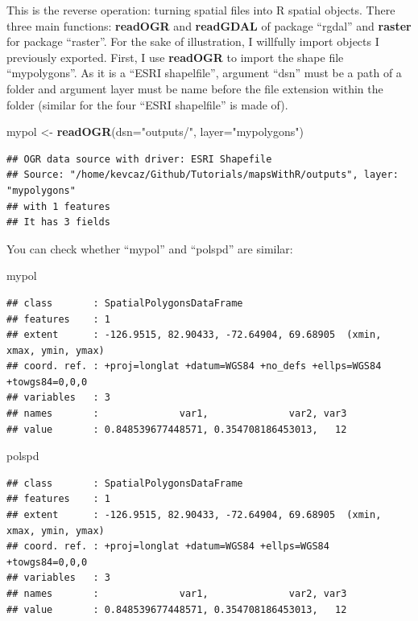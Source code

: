 \documentclass[]{report}
\newenvironment{Shaded}{\begin{snugshade}}{\end{snugshade}}
\newcommand{\DataTypeTok}[1]{\textcolor[rgb]{0.13,0.29,0.53}{#1}}
\newcommand{\KeywordTok}[1]{\textcolor[rgb]{0.13,0.29,0.53}{\textbf{#1}}}
\newcommand{\NormalTok}[1]{#1}
\newcommand{\StringTok}[1]{\textcolor[rgb]{0.31,0.60,0.02}{#1}}
\begin{document}
This is the reverse operation: turning spatial files into R spatial
objects. There three main functions: \textbf{readOGR} and
\textbf{readGDAL} of package ``rgdal'' and \textbf{raster} for package
``raster''. For the sake of illustration, I willfully import objects I
previously exported. First, I use \textbf{readOGR} to import the shape
file ``mypolygons''. As it is a ``ESRI shapelfile'', argument ``dsn''
must be a path of a folder and argument layer must be name before the
file extension within the folder (similar for the four ``ESRI
shapelfile'' is made of).

\begin{Shaded}
\begin{Highlighting}[]
\NormalTok{mypol <-}\StringTok{ }\KeywordTok{readOGR}\NormalTok{(}\DataTypeTok{dsn=}\StringTok{"outputs/"}\NormalTok{, }\DataTypeTok{layer=}\StringTok{"mypolygons"}\NormalTok{)}
\end{Highlighting}
\end{Shaded}

\begin{verbatim}
## OGR data source with driver: ESRI Shapefile 
## Source: "/home/kevcaz/Github/Tutorials/mapsWithR/outputs", layer: "mypolygons"
## with 1 features
## It has 3 fields
\end{verbatim}

You can check whether ``mypol'' and ``polspd'' are similar:

\begin{Shaded}
\begin{Highlighting}[]
\NormalTok{mypol}
\end{Highlighting}
\end{Shaded}

\begin{verbatim}
## class       : SpatialPolygonsDataFrame 
## features    : 1 
## extent      : -126.9515, 82.90433, -72.64904, 69.68905  (xmin, xmax, ymin, ymax)
## coord. ref. : +proj=longlat +datum=WGS84 +no_defs +ellps=WGS84 +towgs84=0,0,0 
## variables   : 3
## names       :              var1,              var2, var3 
## value       : 0.848539677448571, 0.354708186453013,   12
\end{verbatim}

\begin{Shaded}
\begin{Highlighting}[]
\NormalTok{polspd}
\end{Highlighting}
\end{Shaded}

\begin{verbatim}
## class       : SpatialPolygonsDataFrame 
## features    : 1 
## extent      : -126.9515, 82.90433, -72.64904, 69.68905  (xmin, xmax, ymin, ymax)
## coord. ref. : +proj=longlat +datum=WGS84 +ellps=WGS84 +towgs84=0,0,0 
## variables   : 3
## names       :              var1,              var2, var3 
## value       : 0.848539677448571, 0.354708186453013,   12
\end{verbatim}
\end{document}
